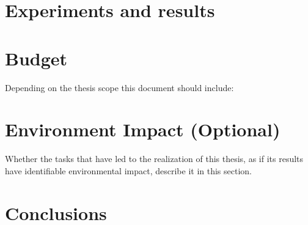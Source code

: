 \documentclass[a4paper]{article}
\begin{document}


\newpage
\tableofcontents

\newpage
\listoffigures
\lstlistoflistings
\listoftables

\newpage

\newpage

\newpage

\newpage


\newpage


\newpage



\clearpage



\clearpage




\newpage

\clearpage
\section{Experiments and results}
\label{sec:tests}
\lipsum[9]

\clearpage
\section{Budget}
{
\foreignlanguage{english}{Depending on the thesis scope this document should include:}}

\clearpage
\section[Environment Impact (Optional)]{{Environment Impact (Optional)}}

{Whether the tasks that have led to the realization of this thesis, as if its results have identifiable environmental
impact, describe it in this section.}

\clearpage
\section{Conclusions}
\label{sec:conclusions}
\end{document}
